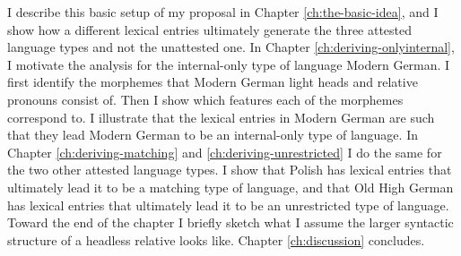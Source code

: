 I describe this basic setup of my proposal in Chapter \ref{ch:the-basic-idea}, and I show how a different lexical entries ultimately generate the three attested language types and not the unattested one.
In Chapter \ref{ch:deriving-onlyinternal}, I motivate the analysis for the internal-only type of language Modern German. I first identify the morphemes that Modern German light heads and relative pronouns consist of. Then I show which features each of the morphemes correspond to. I illustrate that the lexical entries in Modern German are such that they lead Modern German to be an internal-only type of language.
In Chapter \ref{ch:deriving-matching} and \ref{ch:deriving-unrestricted} I do the same for the two other attested language types. I show that Polish has lexical entries that ultimately lead it to be a matching type of language, and that Old High German has lexical entries that ultimately lead it to be an unrestricted type of language.
Toward the end of the chapter I briefly sketch what I assume the larger syntactic structure of a headless relative looks like.
Chapter \ref{ch:discussion} concludes.

